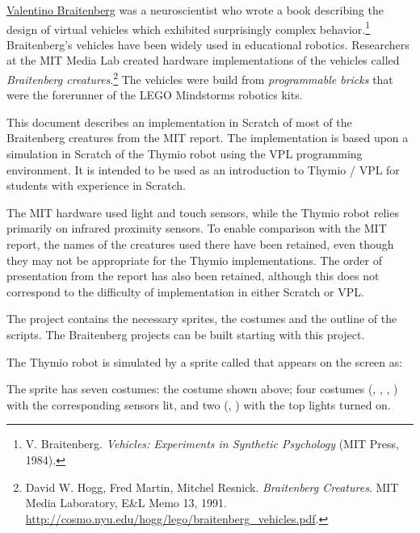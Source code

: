 \label{ch.brait}


\href{http://en.wikipedia.org/wiki/Valentino_Braitenberg}{Valentino
Braitenberg} was a neuroscientist who wrote a book describing
the design of virtual vehicles which exhibited surprisingly complex
behavior.\footnote{V. Braitenberg. \textit{Vehicles: Experiments in
Synthetic Psychology} (MIT Press, 1984).} Braitenberg's vehicles have
been widely used in educational robotics. Researchers at the MIT Media
Lab created hardware implementations of the vehicles called
\emph{Braitenberg creatures}.\footnote{David W. Hogg, Fred Martin,
Mitchel Resnick. \textit{Braitenberg Creatures}. MIT Media Laboratory,
E\&L Memo 13, 1991.
\href{http://cosmo.nyu.edu/hogg/lego/braitenberg_vehicles.pdf}{http://cosmo.nyu.edu/hogg/lego/braitenberg\_vehicles.pdf}.} The
vehicles were build from \emph{programmable bricks} that were the
forerunner of the LEGO Mindstorms robotics kits.

This document describes an implementation in Scratch of most of the
Braitenberg creatures from the MIT report. The implementation is based
upon a simulation in Scratch of the Thymio robot using the VPL
programming environment. It is intended to be used as an introduction to
Thymio / VPL for students with experience in Scratch.

The MIT hardware used light and touch sensors, while the Thymio robot
relies primarily on infrared proximity sensors. To enable comparison
with the MIT report, the names of the creatures used there have been
retained, even though they may not be appropriate for the Thymio
implementations. The order of presentation from the report has also been
retained, although this does not correspond to the difficulty of
implementation in either Scratch or VPL.

\newpage


The project  contains the necessary sprites, the costumes
and the outline of the scripts. The Braitenberg projects can be built
starting with this project. 

The Thymio robot is simulated by a sprite called  that appears
on the screen as:


The sprite has seven costumes: the  costume shown above; four
costumes (, , , ) with the
corresponding sensors lit, and two (, ) with the top
lights turned on.

